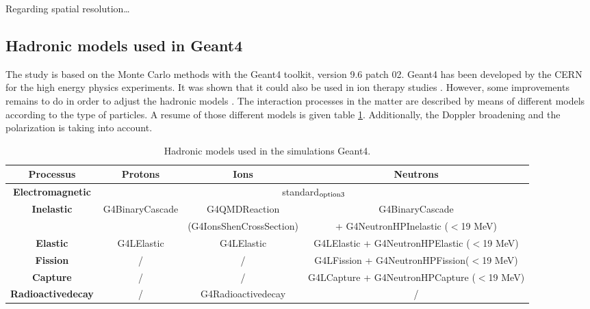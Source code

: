 \documentclass[11pt]{iopart}
\begin{document}
Regarding spatial resolution\dots{}


\subsection{Hadronic models used in Geant4}

The study is based on the Monte Carlo methods with the Geant4 toolkit, version 9.6 patch 02. Geant4 has been developed by the CERN for the high energy physics experiments. It was shown that it could also be used in ion therapy studies \cite{cirrone_hadrontherapy_2011,toshito_new_2010}. However, some improvements remains to do in order to adjust the hadronic models \cite{dedes_assessment_2014} .
The interaction processes in the matter are described by means of different models according to the type of particles. A resume of those different models is given table \ref{table:table_modele_physic_CC_simulation_Hadronth}. Additionally, the Doppler broadening and the polarization is taking into account. 


\begin{table}[ht]
\label{physlist_ion}
\caption{Hadronic models used in the simulations Geant4.}
\begin{scriptsize}
\begin{center}
\renewcommand{\arraystretch}{1.2}
\begin{tabular} {cccc}\hline
\textbf{Processus} & \textbf{Protons} & \textbf{Ions} & \textbf{Neutrons} \\ \hline 
\textbf{Electromagnetic} & \multicolumn{3}{c}{standard$_{\rm{option3}}$} \\ %
\textbf{Inelastic} & G4BinaryCascade & G4QMDReaction  &  G4BinaryCascade  \\ 
 & & (G4IonsShenCrossSection)&+ G4NeutronHPInelastic ($<$19 MeV)\\ %
\textbf{Elastic} & G4LElastic & G4LElastic & G4LElastic + G4NeutronHPElastic ($<$19 MeV)\\ %
\textbf{Fission} & / & / & G4LFission + G4NeutronHPFission($<$19 MeV) \\ %
\textbf{Capture} & / & / & G4LCapture +  G4NeutronHPCapture ($<$19 MeV) \\ %
\textbf{Radioactivedecay} & / & G4Radioactivedecay & / \\ \hline
\end{tabular}
\end{center}
\end{scriptsize}
\label{table:table_modele_physic_CC_simulation_Hadronth}
\end{table}
\end{document}
